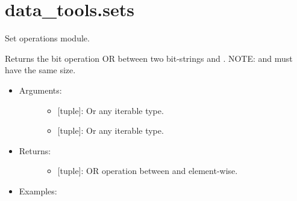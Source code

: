 \documentclass[letterpaper,10pt,english]{sphinxmanual}
\begin{document}
\label{\detokenize{sets:module-data_tools.sets}}

\section{data\_tools.sets}
\label{\detokenize{sets:data-tools-sets}}\label{\detokenize{sets::doc}}
Set operations module.

\begin{fulllineitems}
\label{\detokenize{sets:data_tools.sets.bit_or}}
Returns the bit operation OR between two bit-strings  and .
NOTE:  and  must have the same size.
\begin{itemize}
\item {} \begin{description}
\item[{Arguments:}] \leavevmode\begin{itemize}
\item {} 
 {[}tuple{]}: Or any iterable type.

\item {} 
 {[}tuple{]}: Or any iterable type.

\end{itemize}

\end{description}

\item {} \begin{description}
\item[{Returns:}] \leavevmode\begin{itemize}
\item {} 
{[}tuple{]}: OR operation between  and  element-wise.

\end{itemize}

\end{description}

\item {} \begin{description}
\item[{Examples:}] \leavevmode
{}%
\begin{sphinxVerbatim}[commandchars=\\\{\}]
        
 
\end{sphinxVerbatim}


\end{description}
\end{itemize}
\end{fulllineitems}
\end{document}
